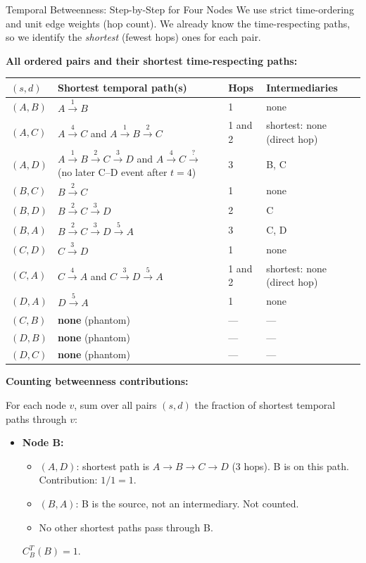 \begin{examplebox}{Temporal Betweenness: Step-by-Step for Four Nodes}
We use strict time-ordering and unit edge weights (hop count). We already know the
time-respecting paths, so we identify the \textit{shortest} (fewest hops) ones for each pair.

\medskip
\noindent\textbf{All ordered pairs and their shortest time-respecting paths:}

\begin{center}
\begin{tabular}{llll}
\toprule
$(s,d)$ & Shortest temporal path(s) & Hops & Intermediaries \\
\midrule
$(A,B)$ & $A \xrightarrow{1} B$ & 1 & none \\
$(A,C)$ & $A \xrightarrow{4} C$ and $A \xrightarrow{1} B \xrightarrow{2} C$ & 1 and 2 & shortest: none (direct hop) \\
$(A,D)$ & $A \xrightarrow{1} B \xrightarrow{2} C \xrightarrow{3} D$ and $A \xrightarrow{4} C \xrightarrow{?}$ (no later C--D event after $t=4$) & 3 & B, C \\
$(B,C)$ & $B \xrightarrow{2} C$ & 1 & none \\
$(B,D)$ & $B \xrightarrow{2} C \xrightarrow{3} D$ & 2 & C \\
$(B,A)$ & $B \xrightarrow{2} C \xrightarrow{3} D \xrightarrow{5} A$ & 3 & C, D \\
$(C,D)$ & $C \xrightarrow{3} D$ & 1 & none \\
$(C,A)$ & $C \xrightarrow{4} A$ and $C \xrightarrow{3} D \xrightarrow{5} A$ & 1 and 2 & shortest: none (direct hop) \\
$(D,A)$ & $D \xrightarrow{5} A$ & 1 & none \\
$(C,B)$ & \textbf{none} (phantom) & --- & --- \\
$(D,B)$ & \textbf{none} (phantom) & --- & --- \\
$(D,C)$ & \textbf{none} (phantom) & --- & --- \\
\bottomrule
\end{tabular}
\end{center}

\medskip
\noindent\textbf{Counting betweenness contributions:}

For each node $v$, sum over all pairs $(s,d)$ the fraction of shortest temporal paths through
$v$:

\begin{itemize}
  \item \textbf{Node B:}
    \begin{itemize}[noitemsep]
      \item $(A,D)$: shortest path is $A \to B \to C \to D$ (3 hops). B is on this path.
            Contribution: $1/1 = 1$.
      \item $(B,A)$: B is the source, not an intermediary. Not counted.
      \item No other shortest paths pass through B.
    \end{itemize}
    $C_B^T(B) = 1$.


\end{itemize}
\end{examplebox}
